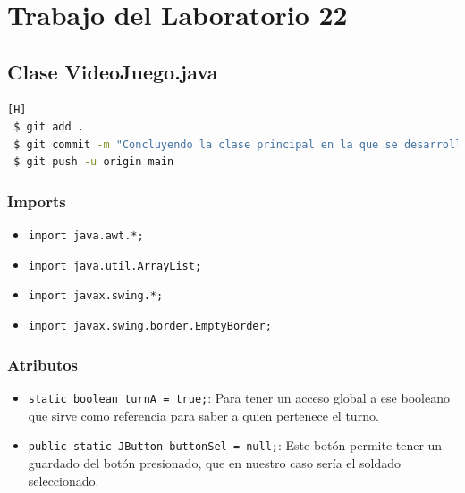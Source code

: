 \documentclass{article}
\newcommand{\itemPracticeNumber}{22}
\begin{document}
\newpage
 
	\section{Trabajo del Laboratorio \itemPracticeNumber}
        
        



\subsection{Clase VideoJuego.java}
\begin{lstlisting}[language=bash,caption={Commit \href{https://github.com/hernanchoquehuanca/fp2-23b/commit/6cc54a52b073c8adc07ae363b91489277e1490bb}{9575acc}: Concluyendo la clase principal, la cual contiene el main junto con la interfaz gráfica}][H]
 $ git add .
 $ git commit -m "Concluyendo la clase principal en la que se desarrollara el juego"			
 $ git push -u origin main
\end{lstlisting}
\subsubsection{Imports}
\begin{itemize}
    \item \texttt{import java.awt.*;}
    \item \texttt{import java.util.ArrayList;}
    \item \texttt{import javax.swing.*;}
    \item \texttt{import javax.swing.border.EmptyBorder;}
\end{itemize}


\subsubsection{Atributos}
\begin{itemize}
    \item \texttt{static boolean turnA = true;}: Para tener un acceso global a ese booleano que sirve como referencia para saber a quien pertenece el turno.
    \item \texttt{public static JButton buttonSel = null;}: Este botón permite tener un guardado del botón presionado, que en nuestro caso sería el soldado seleccionado.
\end{itemize}

\end{document}
